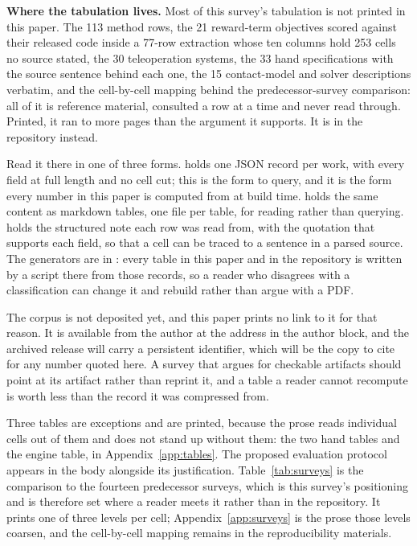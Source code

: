 \textbf{Where the tabulation lives.}\label{app:method:tabulation}
Most of this survey's tabulation is not printed in this paper. The 113 method rows, the 21
reward-term objectives scored against their released code inside a 77-row extraction whose ten
columns hold 253 cells no source stated, the 30 teleoperation systems, the 33 hand specifications with the source sentence behind each one, the 15 contact-model
and solver descriptions verbatim, and the cell-by-cell mapping behind the predecessor-survey
comparison: all of it is
reference material, consulted a row at a time and never read through. Printed, it ran to more pages
than the argument it supports. It is in the repository instead.

Read it there in one of three forms.  holds one JSON record per work, with
every field at full length and no cell cut; this is the form to query, and it is the form every
number in this paper is computed from at build time.  holds the same content
as markdown tables, one file per table, for reading rather than querying. 
holds the structured note each row was read from, with the quotation that supports each field, so
that a cell can be traced to a sentence in a parsed source. The generators are in :
every table in this paper and in the repository is written by a script there from those records,
so a reader who disagrees with a classification can change it and rebuild rather than argue with a
PDF.

The corpus is not deposited yet, and this paper prints no link to it for that reason. It is
available from the author at the address in the author block, and the archived release will carry a
persistent identifier, which will be the copy to cite for any number quoted here. A survey that
argues for checkable artifacts should point at its artifact rather than reprint it, and a table a
reader cannot recompute is worth less than the record it was compressed from.

Three tables are exceptions and are printed, because the prose reads individual cells out of them
and does not stand up without them: the two hand tables and the engine table, in
Appendix~\ref{app:tables}. The proposed evaluation protocol appears in the body alongside its
justification. Table~\ref{tab:surveys} is the comparison to the fourteen predecessor
surveys, which is this survey's positioning and is therefore set where a reader meets it rather
than in the repository. It prints one of three levels per cell; Appendix~\ref{app:surveys} is the
prose those levels coarsen, and the cell-by-cell mapping remains in the reproducibility
materials.

